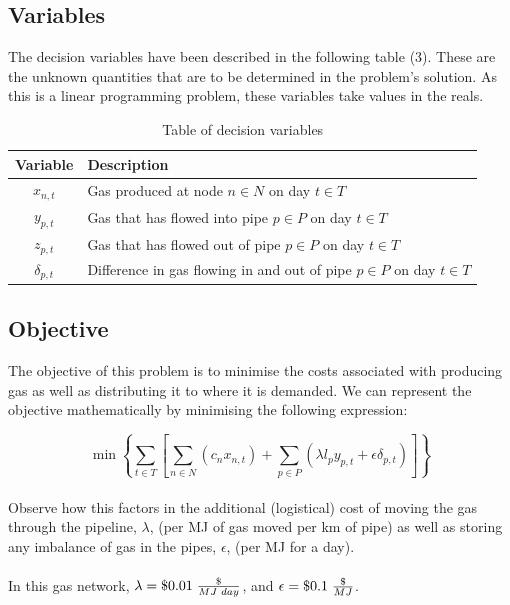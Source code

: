 \documentclass{article}
\begin{document}
\subsection{Variables}
\bigskip
The decision variables have been described in the following table (3). These are the unknown quantities that are to be determined in the problem's solution. As this is a linear programming problem, these variables take values in the reals.
\renewcommand\baselinestretch{1.5}
\begin{table}[h]
    \centering
    \color{black}
    \begin{tabular}{|c:l|}
        \hline
        \textbf{Variable} & \textbf{Description} \\
        \hline
        \(x_{n,t}\) & Gas produced at node \(n\in N\) on day \(t \in T\) \\ \hdashline
        \(y_{p,t}\) & Gas that has flowed into pipe \(p\in P\) on day \(t \in T\) \\ \hdashline
        \(z_{p,t}\) & Gas that has flowed out of pipe \(p\in P\) on day \(t \in T\) \\ \hdashline
        \(\delta_{p,t}\) & Difference in gas flowing in and out of pipe \(p\in P\) on day \(t \in T\) \\
        \hline
    \end{tabular}
    \caption{Table of decision variables}
    \label{tab:vars}
\end{table}
\renewcommand\baselinestretch{1}
\bigskip
\subsection{Objective}
\bigskip
The objective of this problem is to minimise the costs associated with producing gas as well as distributing it to where it is demanded. We can represent the objective mathematically by minimising the following expression:

\[\min{\left\{\sum_{t\in T}\left[\sum_{n\in N}(c_n x_{n,t}) + \sum_{p \in P}\left(\lambda l_p y_{p,t} + \epsilon\delta_{p,t}\right)\right]\right\}}\]
\\
Observe how this factors in the additional (logistical) cost of moving the gas through the pipeline, \(\lambda\), (per MJ of gas moved per km of pipe) as well as storing any imbalance of gas in the pipes, \(\epsilon\), (per MJ for a day).\\
\\
In this gas network, \(\lambda = \$0.01 \hspace{0.1cm}\frac{\$}{MJ \hspace{0.1cm} day}\), and \(\epsilon = \$0.1 \hspace{0.1cm}\frac{\$}{MJ}\).
\end{document}
